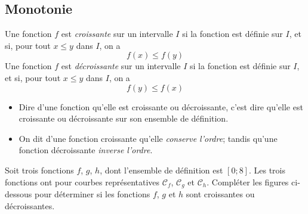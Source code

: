 \documentclass[poly]{mesCours}
\begin{document}
\subsection{Monotonie}
\begin{definition}
Une fonction $f$ est \emph{croissante} sur un intervalle $I$ si la fonction est définie sur $I$, et si, pour tout $x \leq y$ dans $I$, on a
\begin{equation*}
f(x) \leq f(y)
\end{equation*}
Une fonction $f$ est \emph{décroissante} sur un intervalle $I$ si la fonction est définie sur $I$, et si, pour tout $x \leq y$ dans $I$, on a
\begin{equation*}
f(y) \leq f(x)
\end{equation*}
\end{definition}
\begin{remark}
\begin{itemize}
\item Dire d'une fonction qu'elle est croissante ou décroissante, c'est dire qu'elle est croissante ou décroissante sur son ensemble de définition. 
\item On dit d'une fonction croissante qu'elle \emph{conserve l'ordre}; tandis qu'une fonction décroissante \emph{inverse l'ordre}.
\end{itemize}
\end{remark}
\begin{example}
Soit trois fonctions $f$, $g$, $h$, dont l'ensemble de définition est $[0;8]$. Les trois fonctions ont pour courbes représentatives $\mathcal{C}_f$, $\mathcal{C}_g$ et $\mathcal{C}_h$. Compléter les figures ci-dessous pour déterminer si les fonctions $f$, $g$ et $h$ sont croissantes ou décroissantes.
\begin{center}
\end{center}
\end{example}
\end{document}
